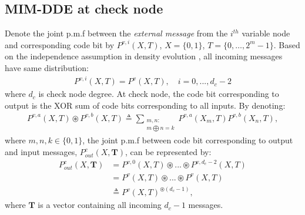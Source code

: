 \documentclass [PhD] {uclathes}
\begin{document}
\subsection{MIM-DDE at check node}
Denote the joint p.m.f between the \textit{external message} from the $i^{th}$ variable node and corresponding code bit  by $P^{v,i}(X,T)$, $X=\{0,1\}$, $T=\{0,\ldots,2^m-1\}$. Based on the independence assumption in density evolution \cite{Richardson2001-de}, all incoming messages have same distribution:
\begin{align}
    P^{v,i} (X,T)=P^v(X,T),\quad i=0,...,d_c-2
\end{align}
where $d_c$ is check node degree. At check node, the code bit corresponding to output is the XOR sum of code bits corresponding to all inputs. By denoting:
\begin{align}
    P^{v,a}(X,T)\circledast P^{v,b}(X,T)\triangleq\sum_{\substack{m,n:\\m\bigoplus n=k} }P^{v,a}(X_m,T)P^{v,b}(X_n,T),
\end{align}
where $m,n,k\in\{0,1\}$, the joint p.m.f between code bit corresponding to output and input messages, $P^c_{out}(X,\mathbf{T})$, can be represented by:
\begin{align}
    P^c_{out}(X,\mathbf{T})&=P^{v,0}(X,T)\circledast ...\circledast P^{v,d_c-2}(X,T)\\
    &=P^{v}(X,T)\circledast ...\circledast P^{v}(X,T)\\
    &\triangleq P^v(X,T)^{\circledast(d_c-1)}, \label{equ: check_opt_prob}
\end{align}
where $\mathbf{T}$ is a vector containing all incoming $d_c-1$ messages.
\end{document}

